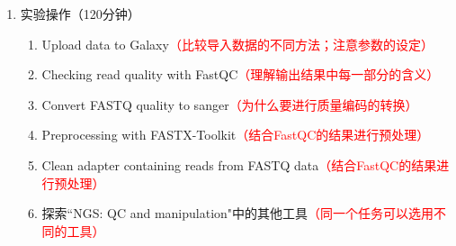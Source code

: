 \documentclass{TIJMUjiaoanSY}
\begin{document}
\begin{enumerate}
  \item 实验操作（120分钟）
    \begin{enumerate}
      \item Upload data to Galaxy\textcolor{red}{（比较导入数据的不同方法；注意参数的设定）}
      \item Checking read quality with FastQC\textcolor{red}{（理解输出结果中每一部分的含义）}
      \item Convert FASTQ quality to sanger\textcolor{red}{（为什么要进行质量编码的转换）}
      \item Preprocessing with FASTX-Toolkit\textcolor{red}{（结合FastQC的结果进行预处理）}
      \item Clean adapter containing reads from FASTQ data\textcolor{red}{（结合FastQC的结果进行预处理）}
      \item 探索``NGS: QC and manipulation"中的其他工具\textcolor{red}{（同一个任务可以选用不同的工具）}
    \end{enumerate}
\end{enumerate}


\otherTail
\end{document}
